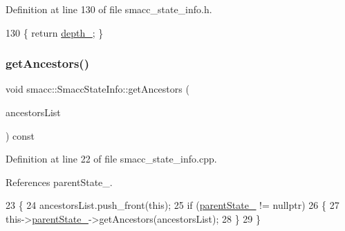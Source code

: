 Definition at line 130 of file smacc\+\_\+state\+\_\+info.\+h.


\begin{DoxyCode}
130 \{ \textcolor{keywordflow}{return} \hyperlink{classsmacc_1_1introspection_1_1SmaccStateInfo_a7e97a482ca49057f27e638268d1a3189}{depth\_}; \}
\end{DoxyCode}
\mbox{\label{classsmacc_1_1introspection_1_1SmaccStateInfo_a6c825d62544c28f3d95aa3ec4da8eebb}} 
\subsubsection{\texorpdfstring{get\+Ancestors()}{getAncestors()}}
{\footnotesize\ttfamily void smacc\+::\+Smacc\+State\+Info\+::get\+Ancestors (\begin{DoxyParamCaption}\item[{std\+::list$<$ const \hyperlink{classsmacc_1_1introspection_1_1SmaccStateInfo}{Smacc\+State\+Info} $\ast$$>$ \&}]{ancestors\+List }\end{DoxyParamCaption}) const}



Definition at line 22 of file smacc\+\_\+state\+\_\+info.\+cpp.



References parent\+State\+\_\+.


\begin{DoxyCode}
23 \{
24     ancestorsList.push\_front(\textcolor{keyword}{this});
25     \textcolor{keywordflow}{if} (\hyperlink{classsmacc_1_1introspection_1_1SmaccStateInfo_afa49a141d2ccdb3d6f9676ed380ce006}{parentState\_} != \textcolor{keyword}{nullptr})
26     \{
27         this->\hyperlink{classsmacc_1_1introspection_1_1SmaccStateInfo_afa49a141d2ccdb3d6f9676ed380ce006}{parentState\_}->getAncestors(ancestorsList);
28     \}
29 \}
\end{DoxyCode}
\mbox{\label{classsmacc_1_1introspection_1_1SmaccStateInfo_a76899507f734e549df07363ba910e94d}} 

